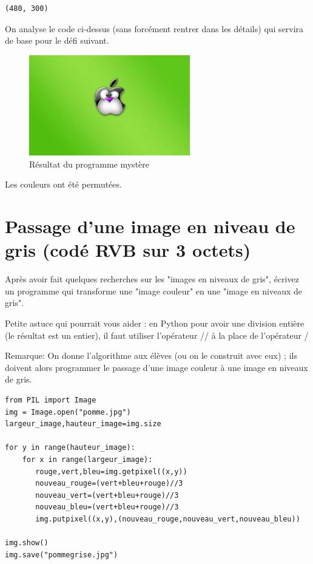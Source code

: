 \documentclass[11pt]{article}
\begin{document}
\begin{verbatim}
(480, 300)
\end{verbatim}


On analyse le code ci-dessus (sans forcément rentrer dans les détails) qui servira de base pour le défi suivant.

\begin{figure}[htbp]
\centering
\includegraphics[width=7cm]{pommeMystere.jpg}
\caption{Résultat du programme mystère}
\end{figure}

Les couleurs ont été permutées.


\section{Passage d'une image en niveau de gris (codé RVB sur 3 octets)}
\label{sec:orgf2738e6}

Après avoir fait quelques recherches sur les "images en niveaux de gris", écrivez un programme qui transforme une "image couleur" en une "image en niveaux de gris".

Petite astuce qui pourrait vous aider : en Python pour avoir une division entière (le résultat est un entier), il faut utiliser l'opérateur // à la place de l'opérateur / 

Remarque: On donne l'algorithme aux élèves (ou on le construit avec eux) ; ils doivent alors programmer le passage d'une image couleur à une image en niveaux de gris.


\begin{verbatim}
from PIL import Image
img = Image.open("pomme.jpg")
largeur_image,hauteur_image=img.size

for y in range(hauteur_image):
    for x in range(largeur_image):
       rouge,vert,bleu=img.getpixel((x,y))
       nouveau_rouge=(vert+bleu+rouge)//3
       nouveau_vert=(vert+bleu+rouge)//3
       nouveau_bleu=(vert+bleu+rouge)//3
       img.putpixel((x,y),(nouveau_rouge,nouveau_vert,nouveau_bleu))

img.show()
img.save("pommegrise.jpg")
\end{verbatim}
\end{document}
